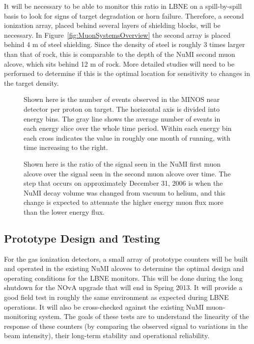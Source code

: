 It will be necessary to be able to monitor this ratio in LBNE on a spill-by-spill basis to look for signs of target degradation or horn failure.  
Therefore, a second ionization array, placed behind several layers of 
shielding blocks, will be necessary.  In Figure~\ref{fig:MuonSystemsOverview}
the second array is placed behind 4 m of steel shielding.  Since the density of steel is roughly 3 times larger than that of rock, this is comparable to the depth of the NuMI second muon alcove, which sits behind 12 m of rock.  More detailed studies will need to be performed to determine if this is the optimal location for sensitivity to changes in the target density.

\begin{figure}[htb]
\centering
\caption[NuMI target experience]
{Shown here is the number of events observed in the MINOS near detector per proton on target.  The horizontal axis is divided into energy bins.  The gray line shows the average number of events in each energy slice over the whole time period.  Within each energy bin each cross indicates the value in roughly one month of running, with time increasing to the right.}
\label{fig:numi_target_decay}
\end{figure}

\begin{figure}[htbp]
\centering
\caption[NuMI muon monitor ratios]
{Shown here is the ratio of the signal seen in 
the NuMI first muon alcove over the signal seen in the second muon alcove over time.  The step that occurs on approximately  December 31, 2006 is when the NuMI decay volume was changed from vacuum to helium, and this change is expected to attenuate the higher energy muon flux more than the lower energy flux.}
\label{fig:numi_mumon_ratio}
\end{figure}


\subsection{Prototype Design and Testing}

For the gas ionization detectors, a small array of prototype
counters will be built and operated in the existing NuMI
alcoves to determine the optimal design and operating conditions for
the LBNE monitors. This will be done during the long
shutdown for the NOvA upgrade that will end in Spring 2013. 
It will provide a good field test in roughly the same environment as expected during LBNE
operations. It will also be cross-checked against the existing NuMI
muon-monitoring system.  The goals of these tests are to understand the linearity of the response of these counters (by comparing the observed signal to variations in the beam intensity), their long-term stability and operational reliability.  

